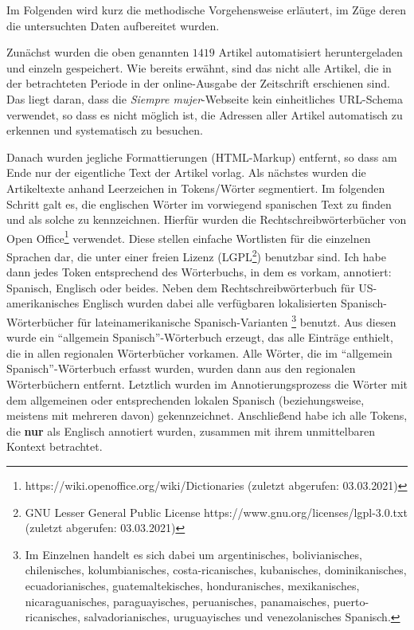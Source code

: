 Im Folgenden wird kurz die methodische Vorgehensweise erläutert, im Züge deren die untersuchten Daten aufbereitet wurden.

Zunächst wurden die oben genannten $1419$ Artikel automatisiert heruntergeladen und einzeln gespeichert.
Wie bereits erwähnt, sind das nicht alle Artikel, die in der betrachteten Periode in der online-Ausgabe der Zeitschrift erschienen sind.
Das liegt daran, dass die \textit{Siempre mujer}-Webseite kein einheitliches URL-Schema verwendet, so dass es nicht möglich ist, die Adressen aller Artikel automatisch zu erkennen und systematisch zu besuchen.

Danach wurden jegliche Formattierungen (HTML-Markup) entfernt, so dass am Ende nur der eigentliche Text der Artikel vorlag.
Als nächstes wurden die Artikeltexte anhand Leerzeichen in Tokens/Wörter segmentiert.
Im folgenden Schritt galt es, die englischen Wörter im vorwiegend spanischen Text zu finden und als solche zu kennzeichnen.
Hierfür wurden die Rechtschreibwörterbücher von Open Office\footnote{https://wiki.openoffice.org/wiki/Dictionaries (zuletzt abgerufen: 03.03.2021)} verwendet.
Diese stellen einfache Wortlisten für die einzelnen Sprachen dar, die unter einer freien Lizenz (LGPL\footnote{GNU Lesser General Public License https://www.gnu.org/licenses/lgpl-3.0.txt (zuletzt abgerufen: 03.03.2021)}) benutzbar sind.
Ich habe dann jedes Token entsprechend des Wörterbuchs, in dem es vorkam, annotiert: Spanisch, Englisch oder beides.
Neben dem Rechtschreibwörterbuch für US-amerikanisches Englisch wurden dabei alle verfügbaren lokalisierten Spanisch-Wörterbücher für lateinamerikanische Spanisch-Varianten
\footnote{Im Einzelnen handelt es sich dabei um argentinisches, bolivianisches, chilenisches, kolumbianisches, costa-ricanisches, kubanisches, dominikanisches, ecuadorianisches, guatemaltekisches, honduranisches, mexikanisches, nicaraguanisches, paraguayisches, peruanisches, panamaisches, puerto-ricanisches, salvadorianisches, uruguayisches und venezolanisches Spanisch.} benutzt.
Aus diesen wurde ein ``allgemein Spanisch''-Wörterbuch erzeugt, das alle Einträge enthielt, die in allen regionalen Wörterbücher vorkamen.
Alle Wörter, die im ``allgemein Spanisch''-Wörterbuch erfasst wurden, wurden dann aus den regionalen Wörterbüchern entfernt.
Letztlich wurden im Annotierungsprozess die Wörter mit dem allgemeinen oder entsprechenden lokalen Spanisch (beziehungsweise, meistens mit mehreren davon) gekennzeichnet.
Anschließend habe ich alle Tokens, die \textbf{nur} als Englisch annotiert wurden, zusammen mit ihrem unmittelbaren Kontext betrachtet.

